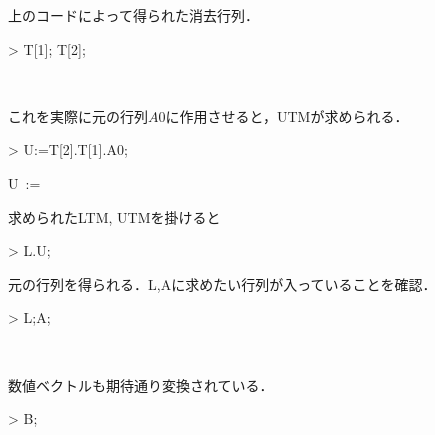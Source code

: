 上のコードによって得られた消去行列．
\begin{MapleInput}
> T[1]; T[2];
\end{MapleInput}
\begin{MapleOutputGather}
 \notag \\
 \notag 
\end{MapleOutputGather}
これを実際に元の行列$A0$に作用させると，UTMが求められる．
\begin{MapleInput}
> U:=T[2].T[1].A0;
\end{MapleInput}
\begin{MapleOutput}
U\, := \, 
\end{MapleOutput}
求められたLTM, UTMを掛けると
\begin{MapleInput}
> L.U;
\end{MapleInput}
\begin{MapleOutput}
\end{MapleOutput}
元の行列を得られる．L,Aに求めたい行列が入っていることを確認．
\begin{MapleInput}
> L;A;
\end{MapleInput}
\begin{MapleOutputGather}
 \notag \\
  \notag 
\end{MapleOutputGather}
数値ベクトルも期待通り変換されている．
\begin{MapleInput}
> B;
\end{MapleInput}
\begin{MapleOutput}
\left[ \begin {array}{c} -4\\ 9\\ -2\end {array} \right]
\end{MapleOutput}


